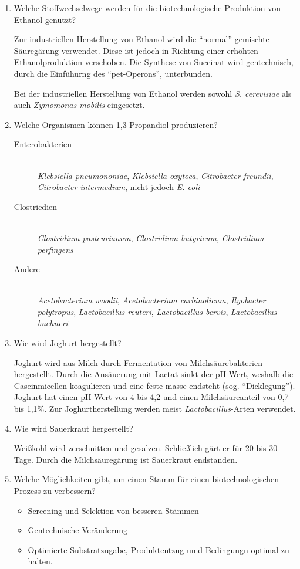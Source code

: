 \begin{enumerate}
	\item Welche Stoffwechselwege werden für die biotechnologische Produktion von Ethanol genutzt?
	
			Zur industriellen Herstellung von Ethanol wird die ``normal'' gemischte-Säuregärung verwendet.
			Diese ist jedoch in Richtung einer erhöhten Ethanolproduktion verschoben.
			Die Synthese von Succinat wird gentechnisch, durch die Einfühurng des ``pet-Operons'', unterbunden.

			Bei der industriellen Herstellung von Ethanol werden sowohl \emph{S. cerevisiae} als auch 
			\emph{Zymomonas mobilis} eingesetzt.

	\item Welche Organismen können 1,3-Propandiol produzieren?
		
		\begin{description}
			\item[Enterobakterien] \hfill \\
				\emph{Klebsiella pneumononiae},
				\emph{Klebsiella oxytoca},
				\emph{Citrobacter freundii},
				\emph{Citrobacter intermedium}, 
				nicht jedoch \emph{E. coli}
			\item[Clostriedien] \hfill \\
				\emph{Clostridium pasteurianum},
				\emph{Clostridium butyricum},
				\emph{Clostridium perfingens}
			\item[Andere] \hfill \\
				\emph{Acetobacterium woodii},
				\emph{Acetobacterium carbinolicum},
				\emph{Ilyobacter polytropus},
				\emph{Lactobacillus reuteri},
				\emph{Lactobacillus bervis},
				\emph{Lactobacillus buchneri}
		\end{description}

	\item Wie wird Joghurt hergestellt?
		
		Joghurt wird aus Milch durch Fermentation von Milchsäurebakterien hergestellt.
		Durch die Ansäuerung mit Lactat sinkt der pH-Wert,
		weshalb die Caseinmicellen koagulieren und eine feste masse endsteht (sog. ``Dicklegung'').
		Joghurt hat einen pH-Wert von 4 bis 4,2 und einen Milchsäureanteil von 0,7 bis 1,1\%.
		Zur Joghurtherstellung werden meist \emph{Lactobacillus}-Arten verwendet.

	\item Wie wird Sauerkraut hergestellt?

		Weißkohl wird zerschnitten und gesalzen.
		Schließlich gärt er für 20 bis 30 Tage.
		Durch die Milchsäuregärung ist Sauerkraut endstanden.

	\item Welche Möglichkeiten gibt, um einen Stamm für einen biotechnologischen Prozess zu verbessern?

		\begin{itemize}
			\item Screening und Selektion von besseren Stämmen
			\item Gentechnische Veränderung 
			\item Optimierte Substratzugabe, Produktentzug umd Bedingungn optimal zu halten.
		\end{itemize}
\end{enumerate}
